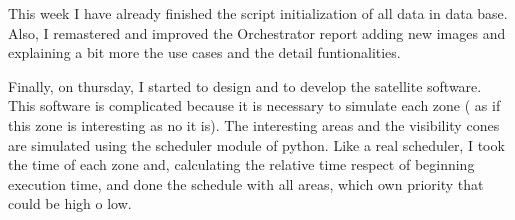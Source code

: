 This week I have already finished the script initialization of all data in data base.
Also, I remastered and improved the Orchestrator report adding new images and explaining a bit more the use cases and the detail funtionalities.

Finally, on thursday, I started to design and to develop the satellite software. This software is complicated because it is necessary to simulate each zone ( as if this zone is interesting as no it is). The interesting areas and the visibility cones are simulated using the scheduler module of python.
Like a real scheduler, I took the time of each zone and, calculating the relative time respect of beginning execution time, and done the schedule with all areas, which own priority that could be high o low.
